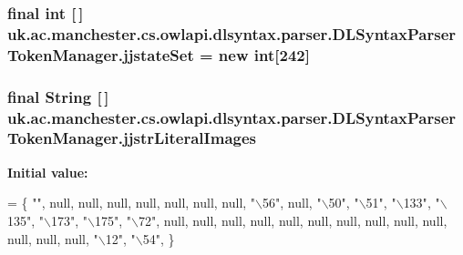 \hypertarget{classuk_1_1ac_1_1manchester_1_1cs_1_1owlapi_1_1dlsyntax_1_1parser_1_1_d_l_syntax_parser_token_manager_a13f083c5161355cfa352e795d7421f13}{
\subsubsection[{jjstate\-Set}]{\setlength{\rightskip}{0pt plus 5cm}final int \mbox{[}$\,$\mbox{]} uk.\-ac.\-manchester.\-cs.\-owlapi.\-dlsyntax.\-parser.\-D\-L\-Syntax\-Parser\-Token\-Manager.\-jjstate\-Set = new int\mbox{[}242\mbox{]}\hspace{0.3cm}{\ttfamily [private]}}}\label{classuk_1_1ac_1_1manchester_1_1cs_1_1owlapi_1_1dlsyntax_1_1parser_1_1_d_l_syntax_parser_token_manager_a13f083c5161355cfa352e795d7421f13}
\hypertarget{classuk_1_1ac_1_1manchester_1_1cs_1_1owlapi_1_1dlsyntax_1_1parser_1_1_d_l_syntax_parser_token_manager_a66ca14c7d2c4bd55ee8e47d7897be89f}{
\subsubsection[{jjstr\-Literal\-Images}]{\setlength{\rightskip}{0pt plus 5cm}final String \mbox{[}$\,$\mbox{]} uk.\-ac.\-manchester.\-cs.\-owlapi.\-dlsyntax.\-parser.\-D\-L\-Syntax\-Parser\-Token\-Manager.\-jjstr\-Literal\-Images\hspace{0.3cm}{\ttfamily [static]}}}\label{classuk_1_1ac_1_1manchester_1_1cs_1_1owlapi_1_1dlsyntax_1_1parser_1_1_d_l_syntax_parser_token_manager_a66ca14c7d2c4bd55ee8e47d7897be89f}
{\bfseries Initial value\-:}
\begin{DoxyCode}
= \{
        \textcolor{stringliteral}{""}, null, null, null, null, null, null, null, \textcolor{stringliteral}{"\(\backslash\)56"}, null, \textcolor{stringliteral}{"\(\backslash\)50"}, \textcolor{stringliteral}{"\(\backslash\)51"},
        \textcolor{stringliteral}{"\(\backslash\)133"}, \textcolor{stringliteral}{"\(\backslash\)135"}, \textcolor{stringliteral}{"\(\backslash\)173"}, \textcolor{stringliteral}{"\(\backslash\)175"}, \textcolor{stringliteral}{"\(\backslash\)72"}, null, null, null, null, null, null, null, null,
        null, null, null, null, null, \textcolor{stringliteral}{"\(\backslash\)12"}, \textcolor{stringliteral}{"\(\backslash\)54"}, \}
\end{DoxyCode}
